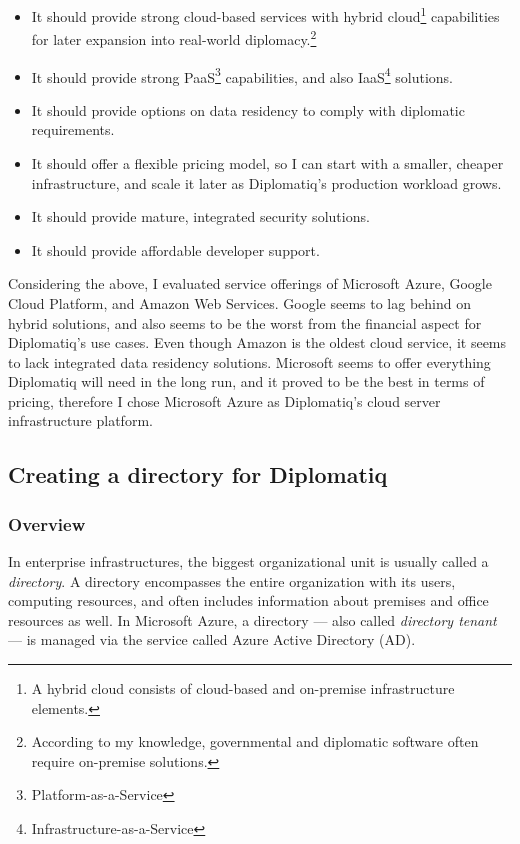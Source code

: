 \begin{itemize}
\item It should provide strong cloud-based services with hybrid cloud\footnote{A hybrid cloud consists of cloud-based and on-premise infrastructure elements.} capabilities for later expansion into real-world diplomacy.\footnote{According to my knowledge, governmental and diplomatic software often require on-premise solutions.}
\item It should provide strong PaaS\footnote{Platform-as-a-Service} capabilities, and also IaaS\footnote{Infrastructure-as-a-Service} solutions.
\item It should provide options on data residency to comply with diplomatic requirements.
\item It should offer a flexible pricing model, so I can start with a smaller, cheaper infrastructure, and scale it later as Diplomatiq's production workload grows.
\item It should provide mature, integrated security solutions.
\item It should provide affordable developer support.
\end{itemize}

Considering the above, I evaluated service offerings of Microsoft Azure, Google Cloud Platform, and Amazon Web Services. Google seems to lag behind on hybrid solutions, and also seems to be the worst from the financial aspect for Diplomatiq's use cases. Even though Amazon is the oldest cloud service, it seems to lack integrated data residency solutions. Microsoft seems to offer everything Diplomatiq will need in the long run, and it proved to be the best in terms of pricing, therefore I chose Microsoft Azure as Diplomatiq's cloud server infrastructure platform.

\subsection{Creating a directory for Diplomatiq}

\subsubsection{Overview}

In enterprise infrastructures, the biggest organizational unit is usually called a \emph{directory}. A directory encompasses the entire organization with its users, computing resources, and often includes information about premises and office resources as well. In Microsoft Azure, a directory — also called \emph{directory tenant} — is managed via the service called Azure Active Directory (AD).

